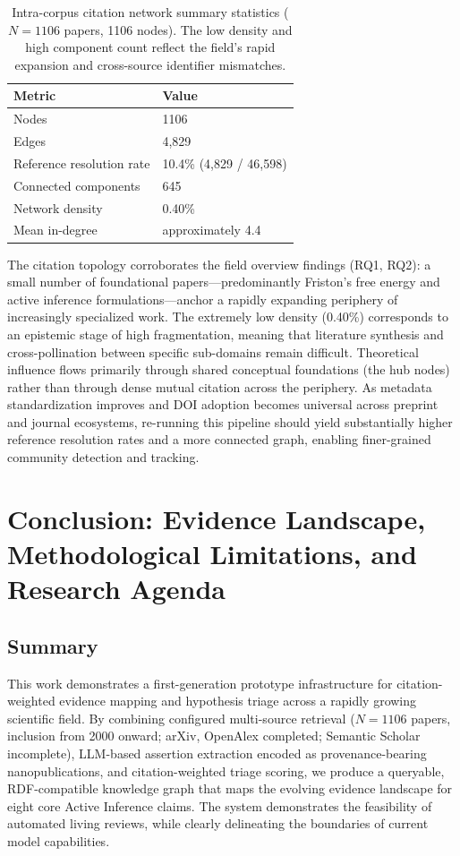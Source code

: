 \documentclass[
  english,
]{article}
\begin{document}
\begin{table}[htbp]
\centering
\caption{Intra-corpus citation network summary statistics ($N = 1106$ papers, 1106 nodes). The low density and high component count reflect the field's rapid expansion and cross-source identifier mismatches.}
\label{tab:citation_network}
\begin{tabular}{ll}
\toprule
\textbf{Metric} & \textbf{Value} \\
\midrule
Nodes & 1106 \\
Edges & 4,829 \\
Reference resolution rate & 10.4\% (4,829 / 46,598) \\
Connected components & 645 \\
Network density & 0.40\% \\
Mean in-degree & approximately 4.4 \\
\bottomrule
\end{tabular}
\end{table}

The citation topology corroborates the field overview findings (RQ1,
RQ2): a small number of foundational papers---predominantly Friston's
free energy and active inference formulations---anchor a rapidly
expanding periphery of increasingly specialized work. The extremely low
density (0.40\%) corresponds to an epistemic stage of high
fragmentation, meaning that literature synthesis and cross-pollination
between specific sub-domains remain difficult. Theoretical influence
flows primarily through shared conceptual foundations (the hub nodes)
rather than through dense mutual citation across the periphery. As
metadata standardization improves and DOI adoption becomes universal
across preprint and journal ecosystems, re-running this pipeline should
yield substantially higher reference resolution rates and a more
connected graph, enabling finer-grained community detection and
tracking.

\newpage

\section{Conclusion: Evidence Landscape, Methodological Limitations, and
Research Agenda}\label{sec:conclusion}

\subsection{Summary}\label{summary}

This work demonstrates a first-generation prototype infrastructure for
citation-weighted evidence mapping and hypothesis triage across a
rapidly growing scientific field. By combining configured multi-source
retrieval (\(N = 1106\) papers, inclusion from 2000 onward; arXiv,
OpenAlex completed; Semantic Scholar incomplete), LLM-based assertion
extraction encoded as provenance-bearing nanopublications, and
citation-weighted triage scoring, we produce a queryable, RDF-compatible
knowledge graph that maps the evolving evidence landscape for eight core
Active Inference claims. The system demonstrates the feasibility of
automated living reviews, while clearly delineating the boundaries of
current model capabilities.
\end{document}
